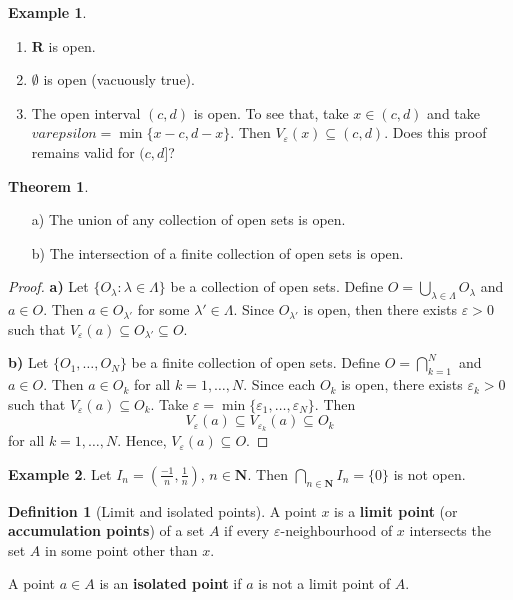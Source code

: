 \documentclass[12pt,a4paper]{article}
\theoremstyle{definition}
\newtheorem{theorem}{Theorem}[section]
\newtheorem{example}{Example}[section]
\newtheorem{definition}{Definition}[section]
\begin{document}
\begin{example}
	\begin{enumerate} \hfill
		\item $\textbf{R}$ is open.
		\item $\emptyset$ is open (vacuously true).
		\item The open interval $(c, d)$ is open. To see that, take $x \in (c,d)$ and take $varepsilon = \min \{ x-c, d-x \}$. Then $V_{\varepsilon}(x) \subseteq (c,d)$. Does this proof remains valid for $(c,d]$?
	\end{enumerate}
\end{example}

\begin{theorem}\label{union-inter-open}
	\begin{itemize} \hfill
		\item[a)] The union of any collection of open sets is open.
		\item[b)] The intersection of a finite collection of open sets is open.
	\end{itemize}
\end{theorem}

\begin{proof}
	\textbf{a)} Let $\{ O_\lambda : \lambda \in \Lambda \}$ be a collection of open sets. Define $O = \bigcup_{\lambda \in \Lambda} O_\lambda$ and $a \in O$. Then $a \in O_{\lambda'}$ for some $\lambda' \in \Lambda$. Since $O_{\lambda'}$ is open, then there exists $\varepsilon > 0$ such that $V_\varepsilon(a) \subseteq O_{\lambda'} \subseteq O$.
	
	\textbf{b)} Let $\{ O_1, \ldots, O_N\}$ be a finite collection of open sets. Define $O = \bigcap_{k=1}^N$ and $a \in O$. Then $a \in O_k$ for all $k = 1, \ldots, N$. Since each $O_k$ is open, there exists $\varepsilon_k > 0$ such that $V_\varepsilon(a) \subseteq O_k$. Take $\varepsilon = \min \{ \varepsilon_1, \ldots, \varepsilon_N \}$. Then
	\[
		V_\varepsilon(a) \subseteq V_{\varepsilon_k}(a) \subseteq O_k
	\]
	for all $k = 1, \ldots, N$. Hence, $V_\varepsilon(a) \subseteq O$.
\end{proof}

\begin{example}
	Let $I_n = \left( \frac{-1}{n}, \frac{1}{n} \right)$, $n \in \textbf{N}$. Then $\bigcap_{n \in \textbf{N}} I_n = \{ 0 \}$ is not open.
\end{example}

\begin{definition}[Limit and isolated points]
	A point $x$ is a \textbf{limit point} (or \textbf{accumulation points}) of a set $A$ if every $\varepsilon$-neighbourhood of $x$ intersects the set $A$ in some point other than $x$.
	
	A point $a \in A$ is an \textbf{isolated point} if $a$ is not a limit point of $A$.
\end{definition}
\end{document}
